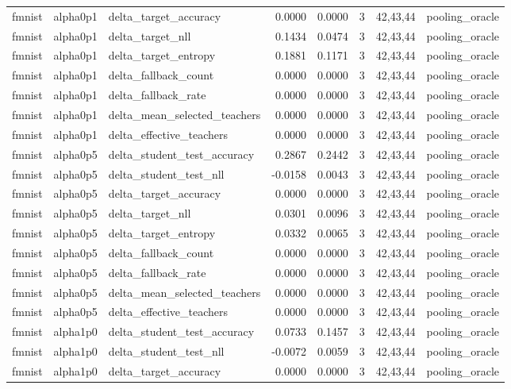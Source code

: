 \begin{tabular}{lllrrrll}
fmnist & alpha0p1 & delta\_target\_accuracy & 0.0000 & 0.0000 & 3 & 42,43,44 & pooling\_oracle \\
fmnist & alpha0p1 & delta\_target\_nll & 0.1434 & 0.0474 & 3 & 42,43,44 & pooling\_oracle \\
fmnist & alpha0p1 & delta\_target\_entropy & 0.1881 & 0.1171 & 3 & 42,43,44 & pooling\_oracle \\
fmnist & alpha0p1 & delta\_fallback\_count & 0.0000 & 0.0000 & 3 & 42,43,44 & pooling\_oracle \\
fmnist & alpha0p1 & delta\_fallback\_rate & 0.0000 & 0.0000 & 3 & 42,43,44 & pooling\_oracle \\
fmnist & alpha0p1 & delta\_mean\_selected\_teachers & 0.0000 & 0.0000 & 3 & 42,43,44 & pooling\_oracle \\
fmnist & alpha0p1 & delta\_effective\_teachers & 0.0000 & 0.0000 & 3 & 42,43,44 & pooling\_oracle \\
fmnist & alpha0p5 & delta\_student\_test\_accuracy & 0.2867 & 0.2442 & 3 & 42,43,44 & pooling\_oracle \\
fmnist & alpha0p5 & delta\_student\_test\_nll & -0.0158 & 0.0043 & 3 & 42,43,44 & pooling\_oracle \\
fmnist & alpha0p5 & delta\_target\_accuracy & 0.0000 & 0.0000 & 3 & 42,43,44 & pooling\_oracle \\
fmnist & alpha0p5 & delta\_target\_nll & 0.0301 & 0.0096 & 3 & 42,43,44 & pooling\_oracle \\
fmnist & alpha0p5 & delta\_target\_entropy & 0.0332 & 0.0065 & 3 & 42,43,44 & pooling\_oracle \\
fmnist & alpha0p5 & delta\_fallback\_count & 0.0000 & 0.0000 & 3 & 42,43,44 & pooling\_oracle \\
fmnist & alpha0p5 & delta\_fallback\_rate & 0.0000 & 0.0000 & 3 & 42,43,44 & pooling\_oracle \\
fmnist & alpha0p5 & delta\_mean\_selected\_teachers & 0.0000 & 0.0000 & 3 & 42,43,44 & pooling\_oracle \\
fmnist & alpha0p5 & delta\_effective\_teachers & 0.0000 & 0.0000 & 3 & 42,43,44 & pooling\_oracle \\
fmnist & alpha1p0 & delta\_student\_test\_accuracy & 0.0733 & 0.1457 & 3 & 42,43,44 & pooling\_oracle \\
fmnist & alpha1p0 & delta\_student\_test\_nll & -0.0072 & 0.0059 & 3 & 42,43,44 & pooling\_oracle \\
fmnist & alpha1p0 & delta\_target\_accuracy & 0.0000 & 0.0000 & 3 & 42,43,44 & pooling\_oracle \\

\end{tabular}
